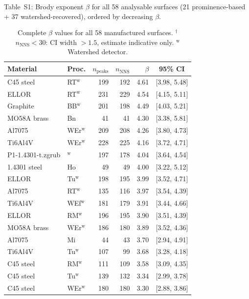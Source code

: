 \documentclass[final,1p,times]{elsarticle}
\theoremstyle{definition}
\begin{document}
Table~S1: Brody exponent $\beta$ for all 58 analysable surfaces
(21 prominence-based + 37 watershed-recovered), ordered by decreasing $\beta$.

\begin{table}[htbp]
  \centering
  \caption{Complete $\beta$ values for all 58 manufactured surfaces.
           $^{\dagger}$$n_{\text{NNS}}<30$: CI width $>1.5$, estimate indicative only.
           $^{\text{w}}$Watershed detector.}
  \label{tab:S1}
  \footnotesize
  \begin{tabular}{@{}llrrrc@{}}
    \toprule
    Material & Proc. & $n_{\text{peaks}}$ & $n_{\text{NNS}}$ & $\beta$ & 95\% CI \\
    \midrule
    C45 steel & RT$^{\text{w}}$ & 199 & 192 & 4.61 & [3.98, 5.48] \\
    ELLOR & RT$^{\text{w}}$ & 231 & 229 & 4.54 & [4.15, 5.11] \\
    Graphite & BB$^{\text{w}}$ & 201 & 198 & 4.49 & [4.03, 5.21] \\
    MO58A brass & Bn & 41 & 41 & 4.30 & [3.38, 5.81] \\
    Al7075 & WEr$^{\text{w}}$ & 209 & 208 & 4.26 & [3.80, 4.73] \\
    Ti6Al4V & WEr$^{\text{w}}$ & 228 & 225 & 4.16 & [3.72, 4.71] \\
    P1-1.4301-t.zgrub & $^{\text{w}}$ & 197 & 178 & 4.04 & [3.64, 4.54] \\
    1.4301 steel & Ho & 49 & 49 & 4.00 & [3.22, 5.12] \\
    ELLOR & Tu$^{\text{w}}$ & 198 & 195 & 3.99 & [3.52, 4.71] \\
    Al7075 & RT$^{\text{w}}$ & 135 & 116 & 3.97 & [3.54, 4.39] \\
    Ti6Al4V & WEf$^{\text{w}}$ & 181 & 179 & 3.91 & [3.44, 4.66] \\
    ELLOR & RM$^{\text{w}}$ & 196 & 195 & 3.90 & [3.51, 4.39] \\
    MO58A brass & WEr$^{\text{w}}$ & 186 & 180 & 3.89 & [3.52, 4.36] \\
    Al7075 & Mi & 44 & 43 & 3.70 & [2.94, 4.91] \\
    Ti6Al4V & Tu$^{\text{w}}$ & 107 & 99 & 3.68 & [3.28, 4.18] \\
    C45 steel & RM$^{\text{w}}$ & 111 & 109 & 3.58 & [3.09, 4.35] \\
    C45 steel & Tu$^{\text{w}}$ & 139 & 132 & 3.34 & [2.99, 3.78] \\
    C45 steel & WEr$^{\text{w}}$ & 180 & 180 & 3.30 & [2.88, 3.86] \\

\end{tabular}
\end{table}
\end{document}

